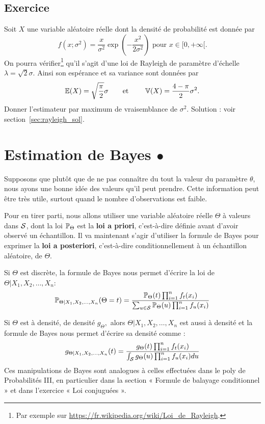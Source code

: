 \subsection{Exercice} 
\label{sec:rayleigh_exo}
Soit $X$ une variable aléatoire réelle dont la densité de probabilité est donnée par 
\[
  f(x; \sigma^2) = \frac{x}{\sigma^2} \exp \left( - \frac{x^2}{2 \sigma^2} \right) \text{ pour } x \in [0, +\infty[.
\]
On pourra vérifier\footnote{Par exemple sur \href{https://fr.wikipedia.org/wiki/Loi_de_Rayleigh}{https://fr.wikipedia.org/wiki/Loi\_de\_Rayleigh}.} qu'il s'agit d'une loi de Rayleigh de paramètre d'échelle
$\lambda = \sqrt{2} \sigma$. Ainsi son espérance et sa variance sont données par 
\[
  \mathbb{E}(X) = \sqrt{\frac{\pi}{2}} \sigma \text{\qquad et \qquad} \mathbb{V}(X) =
  \frac{4-\pi}{2} \sigma^2.
\]
Donner l'estimateur par maximum de vraisemblance de $\sigma^2$.
Solution : voir section~\ref{sec:rayleigh_sol}.


\section{Estimation de Bayes $\bullet$}
\label{sec:bayes_est}
Supposons que plutôt que de ne pas connaître du tout la valeur du paramètre
$\theta$, nous ayons une bonne idée des valeurs qu'il peut prendre. Cette
information peut être très utile, surtout quand le nombre d'observations est
faible.

Pour en tirer parti, nous allons utiliser une variable aléatoire réelle
$\Theta$ à valeurs dans $\mathcal{S}$, dont la loi $\mathbb{P}_{\Theta}$ est la \textbf{loi
  a priori}, c'est-à-dire définie avant d'avoir observé un échantillon. Il va
maintenant s'agir d'utiliser la formule de Bayes pour exprimer la \textbf{loi a
  posteriori}, c'est-à-dire conditionnellement à un échantillon aléatoire, de
$\Theta$.

Si $\Theta$ est discrète, la formule de Bayes nous permet
d'écrire la loi de $\Theta|X_1, X_2, \dots, X_n :$
\begin{equation}
  \label{eq:bayes_discret}
  \mathbb{P}_{\Theta|X_1, X_2, \dots, X_n}(\Theta=t) = \frac{\mathbb{P}_{\Theta}(t) \prod_{i=1}^n f_t(x_i)}{
    \sum_{u \in \mathcal{S}} \mathbb{P}_{\Theta}(u) \prod_{i=1}^n f_u(x_i)}
\end{equation}

Si $\Theta$ est à densité, de densité $g_{\Theta},$ alors
$\Theta|X_1, X_2, \dots, X_n$ est aussi à densité et la formule de Bayes nous
permet d'écrire sa densité comme : 
\begin{equation}
  \label{eq:bayes_densite}
  g_{\Theta|X_1, X_2, \dots, X_n}(t) = \frac{g_{\Theta}(t) \prod_{i=1}^n f_t(x_i)}{
    \int_{\mathcal{S}} g_{\Theta}(u) \prod_{i=1}^n f_u(x_i) du}
\end{equation}
Ces manipulations de Bayes sont analogues à celles effectuées dans le poly de
Probabilités III, en particulier dans la section « Formule de balayage
conditionnel » et dans l'exercice « Loi conjuguées ».

